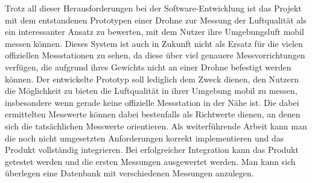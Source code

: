 \newline \newline
Trotz all dieser Herausforderungen bei der Software-Entwicklung ist das Projekt mit dem entstandenen Prototypen einer Drohne zur Messung der Luftqualität als ein interessanter Ansatz zu bewerten, mit dem Nutzer ihre Umgebungsluft mobil messen können. Dieses System ist auch in Zukunft nicht als Ersatz für die vielen offiziellen Messstationen zu sehen, da diese über viel genauere Messvorrichtungen verfügen, die aufgrund ihres Gewichts nicht an einer Drohne befestigt werden können. \newline
Der entwickelte Prototyp soll lediglich dem Zweck dienen, den Nutzern die Möglichkeit zu bieten die Luftqualität in ihrer Umgebung mobil zu messen, insbesondere wenn gerade keine offizielle Messstation in der Nähe ist. Die dabei ermittelten Messwerte können dabei bestenfalls als Richtwerte dienen, an denen sich die tatsächlichen Messwerte orientieren.\newline
\newline
Als weiterführende Arbeit kann man die noch nicht umgesetzten Anforderungen korrekt implementieren und das Produkt vollständig integrieren. Bei erfolgreicher Integration kann das Produkt getestet werden und die ersten Messungen ausgewertet werden. Man kann sich überlegen eine Datenbank mit verschiedenen Messungen anzulegen.  